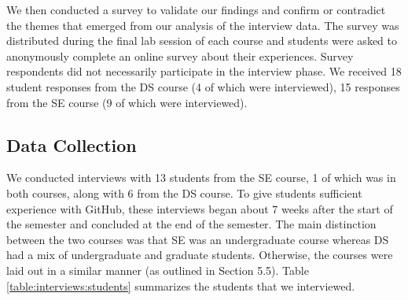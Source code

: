 We then conducted a survey to validate our findings and confirm or contradict the themes that emerged from our analysis of the  interview data. The survey was distributed during the final lab session of each course and students were asked to anonymously complete an online survey about their experiences. Survey respondents did not necessarily participate in the interview phase. We received 18 student responses from the DS course (4 of which were interviewed), 15 responses  from the SE course (9 of which were interviewed).

\subsection{Data Collection}
We conducted interviews with 13 students from the SE course, 1 of which was in both courses, along with 6 from the DS course. To give students sufficient experience with GitHub, these interviews began about 7 weeks after the start of the semester and concluded at the end of the semester. The main distinction between the two courses was that SE was an undergraduate course whereas DS had a mix of undergraduate and graduate students. Otherwise, the courses were laid out in a similar manner (as outlined in Section 5.5). Table \ref{table:interviews:students} summarizes the students that we interviewed.

